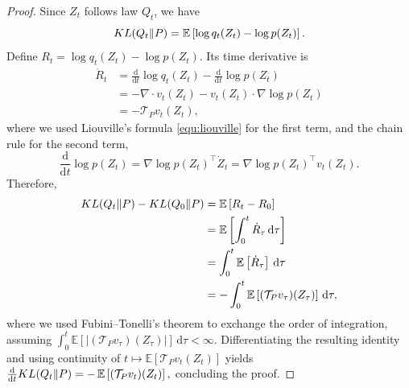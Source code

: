 \documentclass[10pt,a4paper]{amsart}
\def\E{\mbb{E}} %
\def\KL#1#2{\textnormal{KL}({#1}\Vert{#2})}
\newcommand{\df}{\mathrm{d}}
\def\mbb#1{\mathbb{#1}}
\begin{document}
\begin{proof}  
Since $Z_t$ follows law $Q_t$, we have  
\[
\KL{Q_t}{P} = \E\left[\log q_t(Z_t) - \log p(Z_t)\right]. 
\]
Define $R_t = \log q_t(Z_t) - \log p(Z_t)$. Its time derivative is
\begin{align*}  
\dot R_t 
&= \frac{\df}{\df t} \log q_t(Z_t) - \frac{\df}{\df t} \log p(Z_t)  \\
&= - \nabla \cdot v_t(Z_t) - v_t(Z_t) \cdot \nabla \log  p(Z_t) \\
&= -\mathcal{T}_P v_t(Z_t),
\end{align*}
where we used Liouville’s formula \eqref{equ:liouville} for the first term,
and the chain rule for the second term,
\[
\frac{\df}{\df t} \log p(Z_t)
=
\nabla \log p(Z_t)^\top \dot Z_t
=
\nabla \log p(Z_t)^\top v_t(Z_t).
\]
Therefore,
\begin{align*}
\KL{Q_t}{P} - \KL{Q_0}{P} 
&= \E\left[R_t - R_0\right] \\
&= \E\left[\int_0^t \dot R_\tau\, \df \tau \right] \\
&= \int_0^t \E\left[\dot R_\tau\right]\, \df \tau \\
&= -\int_0^t \E\left[(\mathcal{T}_P v_\tau)(Z_\tau)\right]\, \df \tau,
\end{align*}
where we used Fubini--Tonelli’s theorem to exchange the order of integration, assuming  
\(\int_0^t \E [ \lvert (\mathcal{T}_P v_\tau)(Z_\tau)\rvert ]\, \df \tau < \infty\).
Differentiating the resulting identity and using continuity of  
\( t \mapsto \E \left[\mathcal T_P v_t(Z_t)\right] \) yields
$ 
\frac{\mathrm{d}}{\mathrm{d}t}\KL{Q_t}{P}
 = -\,\E\left[(\mathcal{T}_P v_t)(Z_t)\right],$
concluding the proof.
\end{proof}
\end{document}
